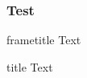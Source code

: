 \documentclass{beamer}
\begin{document}
\begin{frame}
\frametitle{Test} 
   \begin{beamercolorbox}{frametitle} 
      {\LARGE Text}   
   \end{beamercolorbox} 

   \begin{beamercolorbox}{title} 
      {\LARGE Text}   
   \end{beamercolorbox} 
\end{frame}
\end{document}
